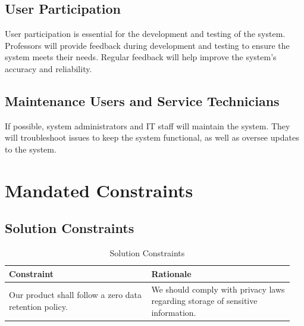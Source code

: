 \documentclass[12pt]{article}
\begin{document}
\subsection{User Participation}
User participation is essential for the development and testing of the system.
Professors will provide feedback during development and testing to ensure the
system meets their needs. Regular feedback will help improve the system's
accuracy and reliability.

\subsection{Maintenance Users and Service Technicians}
If possible, system administrators and IT staff will maintain the system. They
will troubleshoot issues to keep the system functional, as well as oversee
updates to the system.


\newpage
\section{Mandated Constraints}
\subsection{Solution Constraints}
\begin{table}[h!]
    \centering
    \begin{tabular}{| p{0.475\linewidth} | p{0.475\linewidth} |}
    \hline
    \textbf{Constraint}   & \textbf{Rationale} \\
    \hline
    Our product shall follow a zero data retention policy. &
    We should comply with privacy laws regarding storage of sensitive information. \\
    \hline
    \end{tabular}
    \caption{ Solution Constraints}
\end{table}
\end{document}
